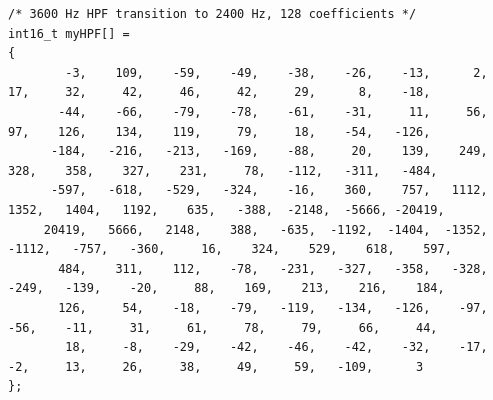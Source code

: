 \documentclass[11pt,pdftex,portrait,letterpaper]{article}
\begin{document}
\begin{lstlisting}[caption={filters.h}, label=l:program5]
/* 3600 Hz HPF transition to 2400 Hz, 128 coefficients */
int16_t myHPF[] =
{
        -3,    109,    -59,    -49,    -38,    -26,    -13,      2,     17,     32,     42,     46,     42,     29,      8,    -18,
       -44,    -66,    -79,    -78,    -61,    -31,     11,     56,     97,    126,    134,    119,     79,     18,    -54,   -126,
      -184,   -216,   -213,   -169,    -88,     20,    139,    249,    328,    358,    327,    231,     78,   -112,   -311,   -484,
      -597,   -618,   -529,   -324,    -16,    360,    757,   1112,   1352,   1404,   1192,    635,   -388,  -2148,  -5666, -20419,
     20419,   5666,   2148,    388,   -635,  -1192,  -1404,  -1352,  -1112,   -757,   -360,     16,    324,    529,    618,    597,
       484,    311,    112,    -78,   -231,   -327,   -358,   -328,   -249,   -139,    -20,     88,    169,    213,    216,    184,
       126,     54,    -18,    -79,   -119,   -134,   -126,    -97,    -56,    -11,     31,     61,     78,     79,     66,     44,
        18,     -8,    -29,    -42,    -46,    -42,    -32,    -17,     -2,     13,     26,     38,     49,     59,   -109,      3
};
\end{lstlisting}
\end{document}
